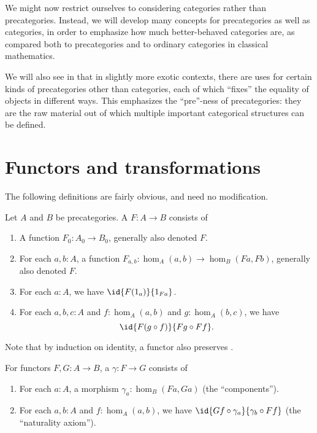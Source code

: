 We might now restrict ourselves to considering categories rather than precategories.
Instead, we will develop many concepts for precategories as well as categories, in order to emphasize how much better-behaved categories are, as compared both to precategories and to ordinary categories in classical mathematics.

We will also see in  that in slightly more exotic contexts, there are uses for certain kinds of precategories other than categories, each of which ``fixes'' the equality of objects in different ways.
This emphasizes the ``pre''-ness of precategories: they are the raw material out of which multiple important categorical structures can be defined.


\section{Functors and transformations}
\label{sec:transfors}

The following definitions are fairly obvious, and need no modification.

\begin{defn}\label{ct:functor}
  Let $A$ and $B$ be precategories.
  A 
  $F:A\to B$ consists of
  \begin{enumerate}
  \item A function $F_0:A_0\to B_0$, generally also denoted $F$.
  \item For each $a,b:A$, a function $F_{a,b}:\hom_A(a,b) \to \hom_B(Fa,Fb)$, generally also denoted $F$.
  \item For each $a:A$, we have $\id{F(1_a)}{1_{Fa}}$.
  \item For each $a,b,c:A$ and $f:\hom_A(a,b)$ and $g:\hom_A(b,c)$, we have
    \[\id{F(g\circ f)}{Fg\circ Ff}.\]\label{ct:functor:comp}
  \end{enumerate}
\end{defn}

Note that by induction on identity, a functor also preserves \idtoiso.

\begin{defn}\label{ct:nattrans}
  For functors $F,G:A\to B$, a 
  $\gamma:F\to G$ consists of
  \begin{enumerate}
  \item For each $a:A$, a morphism $\gamma_a:\hom_B(Fa,Ga)$ (the ``components'').
  \item For each $a,b:A$ and $f:\hom_A(a,b)$, we have $\id{Gf\circ \gamma_a}{\gamma_b\circ Ff}$ (the ``naturality axiom'').
  \end{enumerate}
\end{defn}

